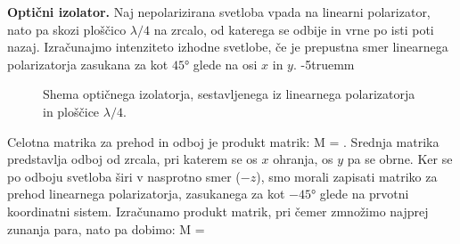 \begin{example}{\bf Optični izolator.} 
\label{ex_izolator}
Naj nepolarizirana svetloba vpada na linearni polarizator, 
nato pa skozi ploščico $\lambda/4$ na zrcalo, od katerega
se odbije in vrne po isti poti nazaj. Izračunajmo intenziteto
izhodne svetlobe, če je prepustna smer linearnega polarizatorja
zasukana za kot $45\si{\degree}$ glede na osi $x$ in $y$. 
\vglue-5truemm
\begin{figure}[h!]
\centering
\def\svgwidth{100truemm} 

\caption{Shema optičnega izolatorja, sestavljenega iz 
linearnega polarizatorja in ploščice $\lambda/4$.}
\label{fig:03_OpticniIzolator}
\end{figure}

Celotna matrika za prehod in odboj je produkt matrik:
\beq
 M = \left[\begin{array}{cc}
1 & -1 \\
-1 & 1\\
\end{array}\right]\cdot 
\left[\begin{array}{cc}
1 & 0 \\
0 & i\\
\end{array}\right]\cdot 
\left[\begin{array}{cc}
1 & 0 \\
0 & -1\\
\end{array}\right]\cdot
\left[\begin{array}{cc}
1 & 0 \\
0 & i\\
\end{array}\right]
\left[\begin{array}{cc}
1 &  1 \\
1 & 1\\
\end{array}\right]\!\!.
\label{eq:03_61}
\eeq
Srednja matrika predstavlja odboj od zrcala, pri katerem se os $x$ ohranja, 
os $y$ pa se obrne. Ker se po odboju svetloba širi v nasprotno
smer ($-z$), smo morali zapisati matriko za prehod linearnega polarizatorja,
zasukanega za kot $-45\si{\degree}$ glede na prvotni koordinatni sistem. 
Izračunamo produkt matrik, pri čemer zmnožimo najprej zunanja para, nato pa dobimo:
\beq
 M = \left[\begin{array}{cc}
1 & -i \\
-1 & i\\
\end{array}\right]\cdot 

\end{example}
